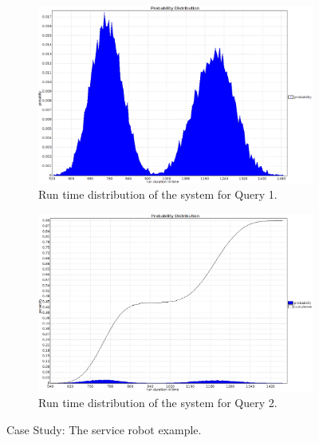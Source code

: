 \documentclass[letterpaper]{article}
\begin{document}
{\begin{figure}[]
\begin{subfigure}{.48\textwidth}
  \centering
  \includegraphics[width=.83\linewidth]{Q1_1_prob_dist.png}  
  \caption{Run time distribution of the system for Query 1.}
  \label{fig:robotic-example-query1}
\end{subfigure}
\hspace{0.1in}
\begin{subfigure}{.48\textwidth}
  \centering
  \includegraphics[width=.83 \linewidth]{Q1_1_cumulative_prob_dist.png}  
  \caption{Run time distribution of the system for Query 2.}
  \label{fig:robotic-example-query2}
\end{subfigure}
\caption{Case Study: The service robot example.}
\label{fig:robotic-example-queries}
\end{figure}
}
\end{document}
